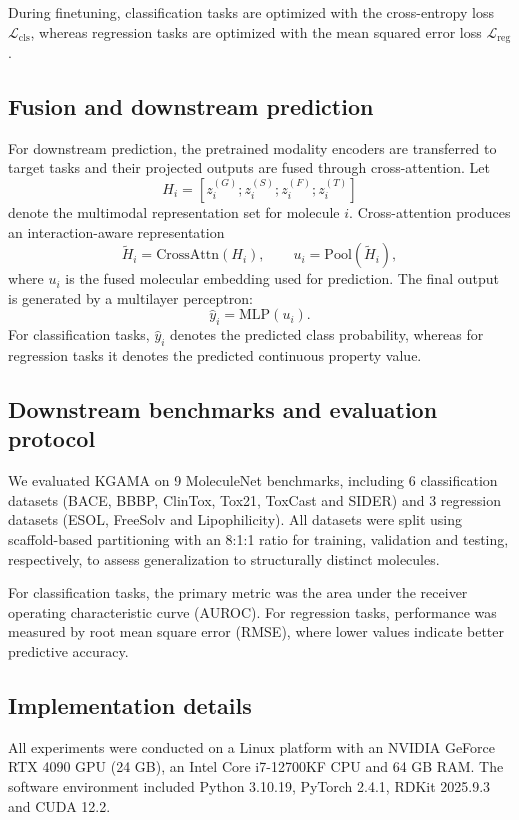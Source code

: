 \documentclass[webpdf,contemporary,large]{oup-authoring-template}%
\begin{document}
During finetuning, classification tasks are optimized with the cross-entropy loss $\mathcal{L}_{\mathrm{cls}}$, whereas regression tasks are optimized with the mean squared error loss $\mathcal{L}_{\mathrm{reg}}$.

\subsection{Fusion and downstream prediction}
For downstream prediction, the pretrained modality encoders are transferred to target tasks and their projected outputs are fused through cross-attention. Let
\begin{equation}
    H_i = [z_i^{(G)}; z_i^{(S)}; z_i^{(F)}; z_i^{(T)}]
\end{equation}
denote the multimodal representation set for molecule $i$. Cross-attention produces an interaction-aware representation
\begin{equation}
    \tilde{H}_i = \mathrm{CrossAttn}(H_i), \qquad u_i = \mathrm{Pool}(\tilde{H}_i),
\end{equation}
where $u_i$ is the fused molecular embedding used for prediction. The final output is generated by a multilayer perceptron:
\begin{equation}
    \hat{y}_i = \mathrm{MLP}(u_i).
\end{equation}
For classification tasks, $\hat{y}_i$ denotes the predicted class probability, whereas for regression tasks it denotes the predicted continuous property value.

\subsection{Downstream benchmarks and evaluation protocol}
We evaluated KGAMA on 9 MoleculeNet benchmarks, including 6 classification datasets (BACE, BBBP, ClinTox, Tox21, ToxCast and SIDER) and 3 regression datasets (ESOL, FreeSolv and Lipophilicity). All datasets were split using scaffold-based partitioning with an 8:1:1 ratio for training, validation and testing, respectively, to assess generalization to structurally distinct molecules.

For classification tasks, the primary metric was the area under the receiver operating characteristic curve (AUROC). For regression tasks, performance was measured by root mean square error (RMSE), where lower values indicate better predictive accuracy.

\subsection{Implementation details}
All experiments were conducted on a Linux platform with an NVIDIA GeForce RTX 4090 GPU (24 GB), an Intel Core i7-12700KF CPU and 64 GB RAM. The software environment included Python 3.10.19, PyTorch 2.4.1, RDKit 2025.9.3 and CUDA 12.2.
\end{document}
